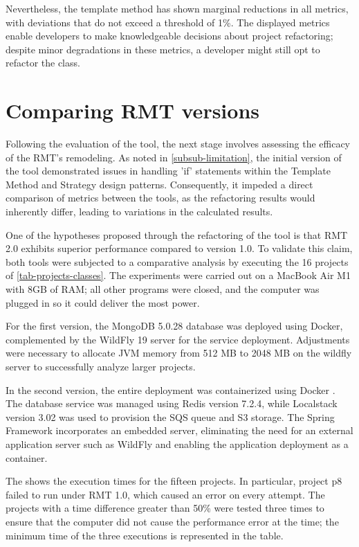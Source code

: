 Nevertheless, the template method has shown marginal reductions in all metrics, with deviations that do not exceed a threshold of 1\%. The displayed metrics enable developers to make knowledgeable decisions about project refactoring; despite minor degradations in these metrics, a developer might still opt to refactor the class.



\section{Comparing RMT versions}
\label{sec-comparing}

Following the evaluation of the tool, the next stage involves assessing the efficacy of the RMT's remodeling. As noted in \cref{subsub-limitation}, the initial version of the tool demonstrated issues in handling 'if' statements within the Template Method and Strategy design patterns. Consequently, it impeded a direct comparison of metrics between the tools, as the refactoring results would inherently differ, leading to variations in the calculated results.

One of the hypotheses proposed through the refactoring of the tool is that RMT 2.0 exhibits superior performance compared to version 1.0. To validate this claim, both tools were subjected to a comparative analysis by executing the 16 projects of \cref{tab-projects-classes}. The experiments were carried out on a MacBook Air M1 with 8GB of RAM; all other programs were closed, and the computer was plugged in so it could deliver the most power.

For the first version, the MongoDB 5.0.28 \cite{mongo} database was deployed using Docker, complemented by the WildFly 19 \cite{wildfly} server for the service deployment. Adjustments were necessary to allocate JVM memory from 512 MB to 2048 MB on the wildfly server to successfully analyze larger projects.

In the second version, the entire deployment was containerized using Docker \cite{docker}. The database service was managed using Redis \cite{Redis} version 7.2.4, while Localstack \cite{localstack} version 3.02 was used to provision the SQS queue and S3 storage. The Spring Framework \cite{spring} incorporates an embedded server, eliminating the need for an external application server such as WildFly and enabling the application deployment as a container.

The  shows the execution times for the fifteen projects. In particular, project p8 failed to run under RMT 1.0, which caused an error on every attempt. The projects with a time difference greater than 50\% were tested three times to ensure that the computer did not cause the performance error at the time; the minimum time of the three executions is represented in the table. 

